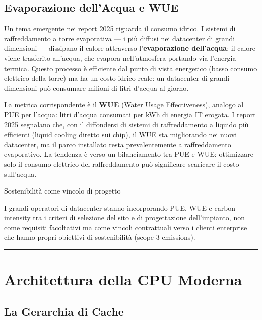 \documentclass[
  italian,
  openany]{book}
\begin{document}
\subsection{Evaporazione dell'Acqua e
WUE}\label{evaporazione-dellacqua-e-wue}

Un tema emergente nei report 2025 riguarda il consumo idrico. I sistemi
di raffreddamento a torre evaporativa --- i più diffusi nei datacenter
di grandi dimensioni --- dissipano il calore attraverso
l'\textbf{evaporazione dell'acqua}: il calore viene trasferito
all'acqua, che evapora nell'atmosfera portando via l'energia termica.
Questo processo è efficiente dal punto di vista energetico (basso
consumo elettrico della torre) ma ha un costo idrico reale: un
datacenter di grandi dimensioni può consumare milioni di litri d'acqua
al giorno.

La metrica corrispondente è il \textbf{WUE} (Water Usage Effectiveness),
analogo al PUE per l'acqua: litri d'acqua consumati per kWh di energia
IT erogata. I report 2025 segnalano che, con il diffondersi di sistemi
di raffreddamento a liquido più efficienti (liquid cooling diretto sui
chip), il WUE sta migliorando nei nuovi datacenter, ma il parco
installato resta prevalentemente a raffreddamento evaporativo. La
tendenza è verso un bilanciamento tra PUE e WUE: ottimizzare solo il
consumo elettrico del raffreddamento può significare scaricare il costo
sull'acqua.

\begin{callouttip}{Sostenibilità come vincolo di progetto}

I grandi operatori di datacenter stanno incorporando PUE, WUE e carbon
intensity tra i criteri di selezione del sito e di progettazione
dell'impianto, non come requisiti facoltativi ma come vincoli
contrattuali verso i clienti enterprise che hanno propri obiettivi di
sostenibilità (scope 3 emissions).

\end{callouttip}

\begin{center}\rule{0.5\linewidth}{0.5pt}\end{center}

\section{Architettura della CPU
Moderna}\label{architettura-della-cpu-moderna}

\subsection{La Gerarchia di Cache}\label{la-gerarchia-di-cache}
\end{document}
